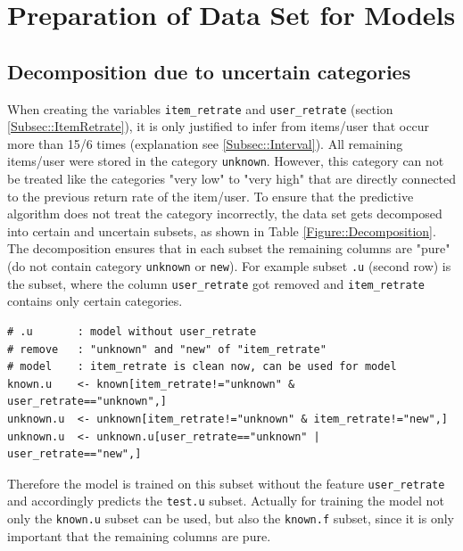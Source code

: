 \documentclass[a4paper,12pt]{article}
\begin{document}
\section{Preparation of Data Set for Models}

\subsection{Decomposition due to uncertain categories}\label{Subsec::4Split}
When creating the variables \texttt{item\_retrate} and \texttt{user\_retrate} (section \ref{Subsec::ItemRetrate}), it is only justified to infer from items/user that occur more than 15/6 times (explanation see \ref{Subsec::Interval}). All remaining items/user were stored in the category \texttt{unknown}. However, this category can not be treated like the categories "very low" to "very high" that are directly connected to the previous return rate of the item/user. To ensure that the predictive algorithm does not treat the category incorrectly, the data set gets decomposed into certain and uncertain subsets, as shown in Table \ref{Figure::Decomposition}. The decomposition ensures that in each subset the remaining columns are "pure" (do not contain category \texttt{unknown} or \texttt{new}). For example subset \texttt{.u} (second row) is the subset, where the column \texttt{user\_retrate} got removed and \texttt{item\_retrate} contains only certain categories. 
\begin{lstlisting}
# .u       : model without user_retrate
# remove   : "unknown" and "new" of "item_retrate"
# model    : item_retrate is clean now, can be used for model
known.u    <- known[item_retrate!="unknown" & user_retrate=="unknown",]
unknown.u  <- unknown[item_retrate!="unknown" & item_retrate!="new",]
unknown.u  <- unknown.u[user_retrate=="unknown" | user_retrate=="new",]
\end{lstlisting}
Therefore the model is trained on this subset without the feature \texttt{user\_retrate} and accordingly predicts the \texttt{test.u} subset. Actually for training the model not only the \texttt{known.u} subset can be used, but also the \texttt{known.f} subset, since it is only important that the remaining columns are pure.\\
\end{document}

